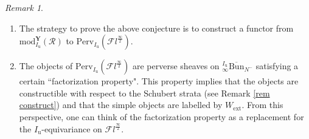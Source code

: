 \documentclass[11pt]{amsart}
\theoremstyle{plain}
\theoremstyle{remark}
\newtheorem{rem}[thm]{Remark}
\numberwithin{equation}{section}
\begin{document}
 \begin{rem}
 \begin{enumerate}
     \item The strategy to prove the above conjecture is to construct a functor from  $\mathrm{mod}^\mathbf{Y}_{I_\mathrm{u}}(\mathcal{R})$ to $\mathrm{Perv}_{{I_\mathrm{u}}}(\mathcal{F}l^{\frac{\infty}{2}})$.
     \item  The objects of $\mathrm{Perv}_{I_\mathrm{u}}(\mathcal{F}l^{\frac{\infty}{2}})$ are perverse sheaves on $^{I_\mathrm{u}}_{\infty}\overline{\mathrm{Bun}}_{N^-}$ satisfying a certain ``factorization property". This property implies that the objects are constructible with respect to the Schubert strata (see Remark \ref{rem construct}) and that the simple objects are labelled by $W_\mathrm{ext}$. From this perspective, one can think of the factorization property as a replacement for the $I_\mathrm{u}$-equivariance on $\mathcal{F}l^\frac{\infty}{2}$.
 \end{enumerate}
 \end{rem}
\end{document}
